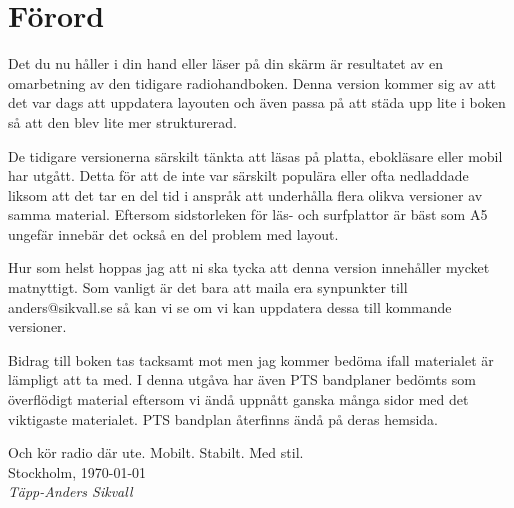 \section*{Förord}

Det du nu håller i din hand eller läser på din skärm är resultatet av en omarbetning av den tidigare radiohandboken. Denna version kommer sig av att det var dags att uppdatera layouten och även passa på att städa upp lite i boken så att den blev lite mer strukturerad.

De tidigare versionerna särskilt tänkta att läsas på platta, ebokläsare eller mobil har utgått. Detta för att de inte var särskilt populära eller ofta nedladdade liksom att det tar en del tid i anspråk att underhålla flera olikva versioner av samma material. Eftersom sidstorleken för läs- och surfplattor är bäst som A5 ungefär innebär det också en del problem med layout.

Hur som helst hoppas jag att ni ska tycka att denna version innehåller mycket matnyttigt. Som vanligt är det bara att maila era synpunkter till anders@sikvall.se så kan vi se om vi kan uppdatera dessa till kommande versioner.

Bidrag till boken tas tacksamt mot men jag kommer bedöma ifall materialet är lämpligt att ta med. I denna utgåva har även PTS bandplaner bedömts som överflödigt material eftersom vi ändå uppnått ganska många sidor med det viktigaste materialet. PTS bandplan återfinns ändå på deras hemsida.

Och kör radio där ute. Mobilt. Stabilt. Med stil.\\[4em]

Stockholm, \today\\
\textit{Täpp-Anders Sikvall}

\clearpage